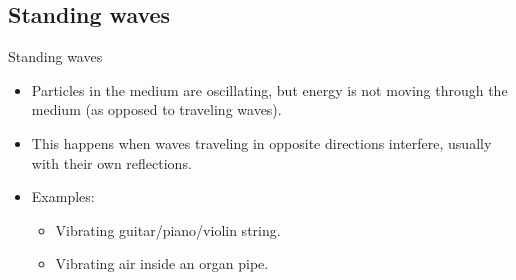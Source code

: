 \documentclass[aspectratio=169,
hyperref={colorlinks,urlcolor=blue}
]{beamer}
\begin{document}
\subsection{Standing waves}
\label{subsec:standingwaves}
\begin{frame}{Standing waves}
\begin{itemize}
\item Particles in the medium are oscillating, but energy is not moving through the medium (as opposed to traveling waves).
\item This happens when waves traveling in opposite directions interfere, usually with their own reflections.
\item Examples:
\begin{itemize}
\item Vibrating guitar/piano/violin string.
\item Vibrating air inside an organ pipe.
\end{itemize}
\end{itemize}
\end{frame}
\end{document}
